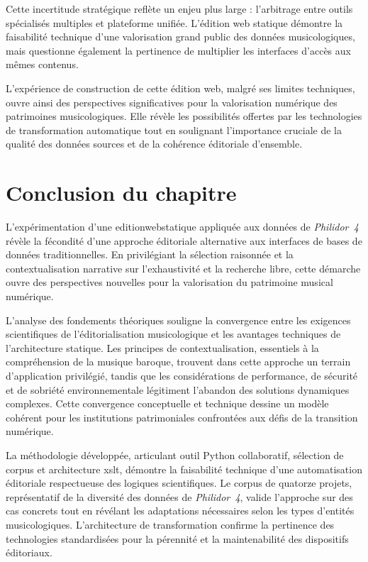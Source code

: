Cette incertitude stratégique reflète un enjeu plus large : l'arbitrage entre outils spécialisés multiples et plateforme unifiée. L'édition web statique démontre la faisabilité technique d'une valorisation grand public des données musicologiques, mais questionne également la pertinence de multiplier les interfaces d'accès aux mêmes contenus.

L'expérience de construction de cette édition web, malgré ses limites techniques, ouvre ainsi des perspectives significatives pour la valorisation numérique des patrimoines musicologiques. Elle révèle les possibilités offertes par les technologies de transformation automatique tout en soulignant l'importance cruciale de la qualité des données sources et de la cohérence éditoriale d'ensemble.

\section*{Conclusion du chapitre}

L'expérimentation d'une \gls{editionwebstatique} appliquée aux données de \textit{Philidor~4} révèle la fécondité d'une approche éditoriale alternative aux interfaces de bases de données traditionnelles. En privilégiant la sélection raisonnée et la contextualisation narrative sur l'exhaustivité et la recherche libre, cette démarche ouvre des perspectives nouvelles pour la valorisation du patrimoine musical numérique.

L'analyse des fondements théoriques souligne la convergence entre les exigences scientifiques de l'éditorialisation musicologique et les avantages techniques de l'architecture statique. Les principes de contextualisation, essentiels à la compréhension de la musique baroque, trouvent dans cette approche un terrain d'application privilégié, tandis que les considérations de performance, de sécurité et de sobriété environnementale légitiment l'abandon des solutions dynamiques complexes. Cette convergence conceptuelle et technique dessine un modèle cohérent pour les institutions patrimoniales confrontées aux défis de la transition numérique.

La méthodologie développée, articulant outil Python collaboratif, sélection de corpus et architecture \gls{xslt}, démontre la faisabilité technique d'une automatisation éditoriale respectueuse des logiques scientifiques. Le corpus de quatorze projets, représentatif de la diversité des données de \textit{Philidor~4}, valide l'approche sur des cas concrets tout en révélant les adaptations nécessaires selon les types d'entités musicologiques. L'architecture de transformation confirme la pertinence des technologies standardisées pour la pérennité et la maintenabilité des dispositifs éditoriaux.

